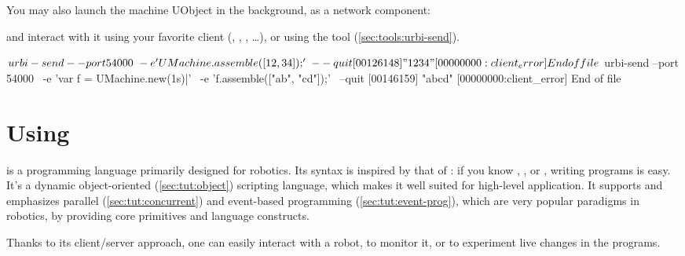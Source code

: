 You may also launch the machine UObject in the background, as a network
component:


\noindent
and interact with it using your favorite client (,
, , \ldots), or using the 
tool (\autoref{sec:tools:urbi-send}).

\begin{shell}[alsolanguage={[interactive]urbiscript}]
$ urbi-send --port 54000                       \
            -e 'UMachine.assemble([12, 34]);'  \
            --quit
[00126148] "1234"
[00000000:client_error] End of file
$ urbi-send --port 54000                     \
            -e 'var f = UMachine.new(1s)|'   \
            -e 'f.assemble(["ab", "cd"]);'   \
            --quit
[00146159] "abcd"
[00000000:client_error] End of file
\end{shell}




\section{Using \us}


\us is a programming language primarily designed for robotics.  Its syntax
is inspired by that of \Cxx: if you know \C, \Cxx, \Java or \Cs, writing \us
programs is easy.  It's a dynamic object-oriented (\autoref{sec:tut:object})
scripting language, which makes it well suited for high-level application.
It supports and emphasizes parallel (\autoref{sec:tut:concurrent}) and
event-based programming (\autoref{sec:tut:event-prog}), which are very
popular paradigms in robotics, by providing core primitives and language
constructs.

Thanks to its client/server approach, one can easily interact with a robot,
to monitor it, or to experiment live changes in the \us programs.


